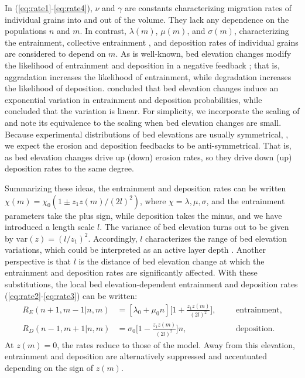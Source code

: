 \documentclass[draft]{agujournal2018}
\begin{document}
In (\ref{eq:rate1}-\ref{eq:rate4}), $\nu$ and $\gamma$ are constants characterizing migration rates of individual grains into and out of the volume. 
They lack any dependence on the populations $n$ and $m$.
In contrast, $\lambda(m)$, $\mu(m)$, and $\sigma(m)$, characterizing the entrainment, collective entrainment \citep[e.g.,][]{Ancey2008, Heyman2013, Heyman2014}, and deposition rates of individual grains are considered to depend on $m$.
As is well-known, bed elevation changes modify the likelihood of entrainment and deposition in a negative feedback \citep{Sawai1987, Wong2007}; that is, aggradation increases the likelihood of entrainment, while degradation increases the likelihood of deposition.
\citet{Wong2007} concluded that bed elevation changes induce an exponential variation in entrainment and deposition probabilities, while \citet{Sawai1987} concluded that the variation is linear.
For simplicity, we incorporate the scaling of \citet{Sawai1987} and note its equivalence to the \citet{Wong2007} scaling when bed elevation changes are small.
Because experimental distributions of bed elevations are usually symmetrical, \citep{Wong2007, Singh2009, Martin2014}, we expect the erosion and deposition feedbacks to be anti-symmetrical.
That is, as bed elevation changes drive up (down) erosion rates, so they drive down (up) deposition rates to the same degree.


Summarizing these ideas, the entrainment and deposition rates can be written $\chi(m) = \chi_0(1\pm z_1 z(m)/(2l)^2)$, where $\chi = \lambda, \mu, \sigma$, and the entrainment parameters take the plus sign, while deposition takes the minus, and we have introduced a length scale $l$.
The variance of bed elevation turns out to be given by $\text{var}(z) = (l / z_1)^2$. Accordingly, $l$ characterizes the range of bed elevation variations, which could be interpreted as an active layer depth \citep[e.g.,][]{Church2017}.
Another perspective is that $l$ is the distance of bed elevation change at which the entrainment and deposition rates are significantly affected.
With these substitutions, the local bed elevation-dependent entrainment and deposition rates (\ref{eq:rate2}-\ref{eq:rate3}) can be written:
\begin{align}
R_E(n+1,m-1|n,m)&=[\lambda_0 + \mu_0 n]\Big[1 + \frac{z_1z(m)}{(2l)^2}\Big], && &\text{entrainment}, \label{eq:rate5}\\
R_D(n-1,m+1|n,m)&=\sigma_0 \Big[1-\frac{z_1z(m)}{(2l)^2}\Big]n, && &\text{deposition}. \label{eq:rate6}
\end{align}
At $z(m)=0$, the rates reduce to those of the \citet{Ancey2008} model.
Away from this elevation, entrainment and deposition are alternatively suppressed and accentuated depending on the sign of $z(m)$.
\end{document}
